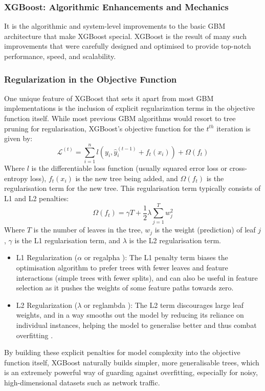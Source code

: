 \subsubsection{XGBoost: Algorithmic Enhancements and Mechanics} 
It is the algorithmic and system-level improvements to the basic GBM architecture that make XGBoost special. XGBoost is the result of many such improvements that were carefully designed and optimised to provide top-notch performance, speed, and scalability.

\subsubsection{Regularization in the Objective Function} 
One unique feature of XGBoost that sets it apart from most GBM implementations is the inclusion of explicit regularization terms in the objective function itself. While most previous GBM algorithms would resort to tree pruning for regularisation, XGBoost's objective function for the $t^{th}$ iteration is given by:
$$ \mathcal{L}^{(t)} = \sum_{i=1}^{n} l(y_i, \hat{y}_i^{(t-1)} + f_t(x_i)) + \Omega(f_t) $$ 
Where $l$ is the differentiable loss function (usually squared error loss or cross-entropy loss), $f_t(x_i)$ is the new tree being added, and $\Omega(f_t)$ is the regularisation term for the new tree. This regularisation term typically consists of L1 and L2 penalties:
$$ \Omega(f_t) = \gamma T + \frac{1}{2} \lambda \sum_{j=1}^{T} w_j^2 $$ 
Where $T$ is the number of leaves in the tree, $w_j$ is the weight (prediction) of leaf $j$, $\gamma$ is the L1 regularisation term, and $\lambda$ is the L2 regularisation term.
\begin{itemize}[noitemsep] 
\item L1 Regularization ($\alpha$ or reg\textunderscore alpha ): The L1 penalty term biases the optimisation algorithm to prefer trees with fewer leaves and feature interactions (simple trees with fewer splits), and can also be useful in feature selection as it pushes the weights of some feature paths towards zero.
\item L2 Regularization ($\lambda$ or reg\textunderscore lambda ): The L2 term discourages large leaf weights, and in a way smooths out the model by reducing its reliance on individual instances, helping the model to generalise better and thus combat overfitting \parencite{habeeb2024two}.
\end{itemize} 
By building these explicit penalties for model complexity into the objective function itself, XGBoost naturally builds simpler, more generalisable trees, which is an extremely powerful way of guarding against overfitting, especially for noisy, high-dimensional datasets such as network traffic.

